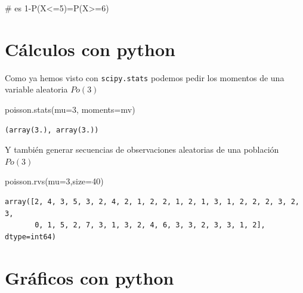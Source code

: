 \documentclass[
  letterpaper,
  DIV=11,
  numbers=noendperiod]{scrreprt}
\newenvironment{Shaded}{\begin{snugshade}}{\end{snugshade}}
\newcommand{\CommentTok}[1]{\textcolor[rgb]{0.37,0.37,0.37}{#1}}
\newcommand{\DecValTok}[1]{\textcolor[rgb]{0.68,0.00,0.00}{#1}}
\newcommand{\NormalTok}[1]{\textcolor[rgb]{0.00,0.23,0.31}{#1}}
\newcommand{\OperatorTok}[1]{\textcolor[rgb]{0.37,0.37,0.37}{#1}}
\newcommand{\StringTok}[1]{\textcolor[rgb]{0.13,0.47,0.30}{#1}}
\begin{document}
\begin{Shaded}
\begin{Highlighting}[]
\CommentTok{\# es 1{-}P(X\textless{}=5)=P(X\textgreater{}=6)}
\end{Highlighting}
\end{Shaded}

\section{Cálculos con python}\label{cuxe1lculos-con-python-9}

Como ya hemos visto con \texttt{scipy.stats} podemos pedir los momentos
de una variable aleatoria \(Po(3)\)

\begin{Shaded}
\begin{Highlighting}[]
\NormalTok{poisson.stats(mu}\OperatorTok{=}\DecValTok{3}\NormalTok{, moments}\OperatorTok{=}\StringTok{\textquotesingle{}mv\textquotesingle{}}\NormalTok{)}
\end{Highlighting}
\end{Shaded}

\begin{verbatim}
(array(3.), array(3.))
\end{verbatim}

Y también generar secuencias de observaciones aleatorias de una
población \(Po(3)\)

\begin{Shaded}
\begin{Highlighting}[]
\NormalTok{poisson.rvs(mu}\OperatorTok{=}\DecValTok{3}\NormalTok{,size}\OperatorTok{=}\DecValTok{40}\NormalTok{)}
\end{Highlighting}
\end{Shaded}

\begin{verbatim}
array([2, 4, 3, 5, 3, 2, 4, 2, 1, 2, 2, 1, 2, 1, 3, 1, 2, 2, 2, 3, 2, 3,
       0, 1, 5, 2, 7, 3, 1, 3, 2, 4, 6, 3, 3, 2, 3, 3, 1, 2], dtype=int64)
\end{verbatim}

\section{Gráficos con python}\label{gruxe1ficos-con-python-2}
\end{document}
